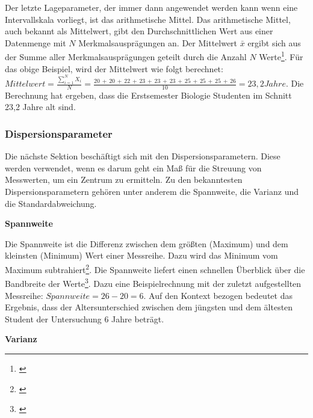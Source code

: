 Der letzte Lageparameter, der immer dann angewendet werden kann wenn eine Intervallskala vorliegt, ist das arithmetische Mittel. Das arithmetische Mittel, auch bekannt als Mittelwert, gibt den Durchschnittlichen Wert aus einer Datenmenge mit $N$ Merkmalsausprägungen an. Der Mittelwert $\bar{x}$ ergibt sich aus der Summe aller Merkmalsausprägungen geteilt durch die Anzahl $N$ Werte\footnote{\cite[vgl.][49\psq]{Statistik2016}}. Für das obige Beispiel, wird der Mittelwert wie folgt berechnet: \\
$Mittelwert = \frac{\sum \limits_{i=1}^N X_i}{N} = \frac{20\,+\,20\,+\,22\,+\,23\,+\,23\,+\,23\,+\,25\,+\,25\,+\,25\,+\,26}{10} = 23,2 Jahre$. Die Berechnung hat ergeben, dass die Erstsemester Biologie Studenten im Schnitt 23,2 Jahre alt sind.


\subsubsection{Dispersionsparameter}
Die nächste Sektion beschäftigt sich mit den Dispersionsparametern. Diese werden verwendet, wenn es darum geht ein Maß für die Streuung von Messwerten, um ein Zentrum zu ermitteln. Zu den bekanntesten Dispersionsparametern gehören unter anderem die Spannweite, die Varianz und die Standardabweichung.

\textbf{Spannweite}

Die Spannweite ist die Differenz zwischen dem größten (Maximum) und dem kleinsten (Minimum) Wert einer Messreihe. Dazu wird das Minimum vom Maximum subtrahiert\footnote{\cite[vgl.][62]{Statistik2016}}. Die Spannweite liefert einen schnellen Überblick über die Bandbreite der Werte\footnote{\cite[vgl.][38]{Kronthaler2016}}. Dazu eine Beispielrechnung mit der zuletzt aufgestellten Messreihe: $Spannweite = 26 - 20 = 6$. Auf den Kontext bezogen bedeutet das Ergebnis, dass der Altersunterschied zwischen dem jüngsten und dem ältesten Student der Untersuchung 6 Jahre beträgt.

\textbf{Varianz}

